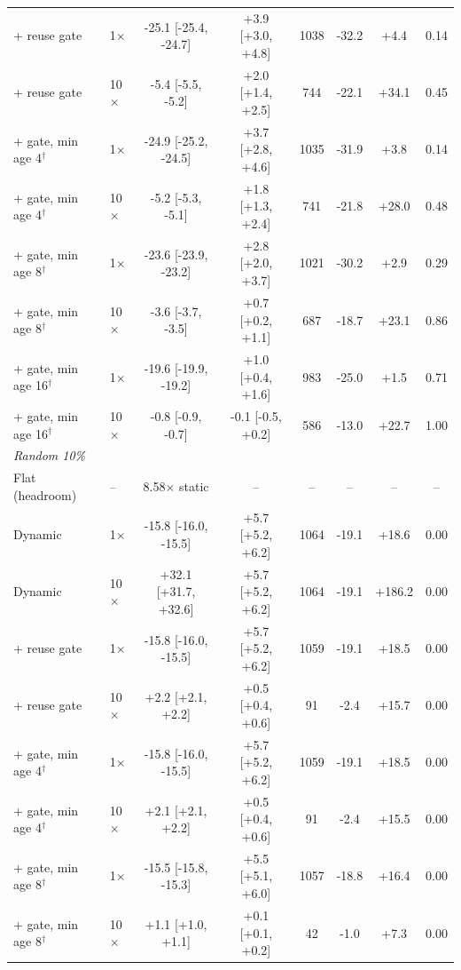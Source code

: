 \begin{table}[h]
\begin{tabular}{llcccccc}
\quad + reuse gate & 1$\times$ & -25.1 [-25.4, -24.7] & +3.9 [+3.0, +4.8] & 1038 & -32.2 & +4.4 & 0.14\\
\quad + reuse gate & 10$\times$ & -5.4 [-5.5, -5.2] & +2.0 [+1.4, +2.5] & 744 & -22.1 & +34.1 & 0.45\\
\quad + gate, min age 4$^\dagger$ & 1$\times$ & -24.9 [-25.2, -24.5] & +3.7 [+2.8, +4.6] & 1035 & -31.9 & +3.8 & 0.14\\
\quad + gate, min age 4$^\dagger$ & 10$\times$ & -5.2 [-5.3, -5.1] & +1.8 [+1.3, +2.4] & 741 & -21.8 & +28.0 & 0.48\\
\quad + gate, min age 8$^\dagger$ & 1$\times$ & -23.6 [-23.9, -23.2] & +2.8 [+2.0, +3.7] & 1021 & -30.2 & +2.9 & 0.29\\
\quad + gate, min age 8$^\dagger$ & 10$\times$ & -3.6 [-3.7, -3.5] & +0.7 [+0.2, +1.1] & 687 & -18.7 & +23.1 & 0.86\\
\quad + gate, min age 16$^\dagger$ & 1$\times$ & -19.6 [-19.9, -19.2] & +1.0 [+0.4, +1.6] & 983 & -25.0 & +1.5 & 0.71\\
\quad + gate, min age 16$^\dagger$ & 10$\times$ & -0.8 [-0.9, -0.7] & -0.1 [-0.5, +0.2] & 586 & -13.0 & +22.7 & 1.00\\
\midrule
\multicolumn{8}{l}{\textit{Random 10\%}}\\
\quad Flat (headroom) & -- & 8.58$\times$ static & -- & -- & -- & -- & --\\
\quad Dynamic & 1$\times$ & -15.8 [-16.0, -15.5] & +5.7 [+5.2, +6.2] & 1064 & -19.1 & +18.6 & 0.00\\
\quad Dynamic & 10$\times$ & +32.1 [+31.7, +32.6] & +5.7 [+5.2, +6.2] & 1064 & -19.1 & +186.2 & 0.00\\
\quad + reuse gate & 1$\times$ & -15.8 [-16.0, -15.5] & +5.7 [+5.2, +6.2] & 1059 & -19.1 & +18.5 & 0.00\\
\quad + reuse gate & 10$\times$ & +2.2 [+2.1, +2.2] & +0.5 [+0.4, +0.6] & 91 & -2.4 & +15.7 & 0.00\\
\quad + gate, min age 4$^\dagger$ & 1$\times$ & -15.8 [-16.0, -15.5] & +5.7 [+5.2, +6.2] & 1059 & -19.1 & +18.5 & 0.00\\
\quad + gate, min age 4$^\dagger$ & 10$\times$ & +2.1 [+2.1, +2.2] & +0.5 [+0.4, +0.6] & 91 & -2.4 & +15.5 & 0.00\\
\quad + gate, min age 8$^\dagger$ & 1$\times$ & -15.5 [-15.8, -15.3] & +5.5 [+5.1, +6.0] & 1057 & -18.8 & +16.4 & 0.00\\
\quad + gate, min age 8$^\dagger$ & 10$\times$ & +1.1 [+1.0, +1.1] & +0.1 [+0.1, +0.2] & 42 & -1.0 & +7.3 & 0.00\\

\end{tabular}
\end{table}
